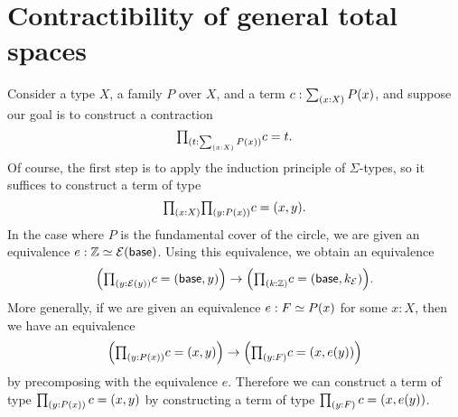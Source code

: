 \section{Contractibility of general total spaces}
Consider a type $X$, a family $P$ over $X$, and a term $c:\sm{x:X}P(x)$, and suppose our goal is to construct a contraction
\begin{equation*}
  \prd{t:\sm{x:X}P(x)}c=t.
\end{equation*}
Of course, the first step is to apply the induction principle of $\Sigma$-types, so it suffices to construct a term of type
\begin{equation*}
\prd{x:X}{y:P(x)} c = (x,y).
\end{equation*}
In the case where $P$ is the fundamental cover of the circle, we are given an equivalence $e:\eqv{\Z}{\mathcal{E}(\base)}$. Using this equivalence, we obtain an equivalence
\begin{equation*}
  \Big(\prd{y:\mathcal{E}(y)}c=(\mathsf{base},y)\Big)\to \Big(\prd{k:\Z}c=(\mathsf{base},k_{\mathcal{E}})\Big).
\end{equation*}
More generally, if we are given an equivalence $e:\eqv{F}{P(x)}$ for some $x:X$, then we have an equivalence
\begin{equation}
\Big(\prd{y:P(x)}c=(x,y)\Big) \to \Big(\prd{y:F}c=(x,e(y))\Big)
\end{equation}
by precomposing with the equivalence $e$. Therefore we can construct a term of type $\prd{y:P(x)}c=(x,y)$ by constructing a term of type $\prd{y:F}c=(x,e(y))$. 

